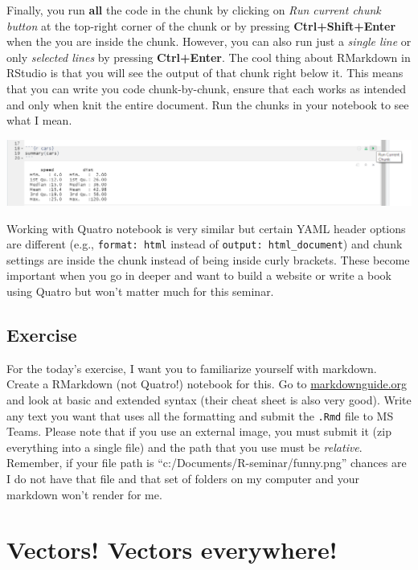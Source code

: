 \documentclass[
]{book}
\begin{document}
Finally, you run \textbf{all} the code in the chunk by clicking on \emph{Run current chunk button} at the top-right corner of the chunk or by pressing \textbf{Ctrl+Shift+Enter} when the you are inside the chunk. However, you can also run just a \emph{single line} or only \emph{selected lines} by pressing \textbf{Ctrl+Enter}. The cool thing about RMarkdown in RStudio is that you will see the output of that chunk right below it. This means that you can write you code chunk-by-chunk, ensure that each works as intended and only when knit the entire document. Run the chunks in your notebook to see what I mean.

\begin{center}\includegraphics[width=1\linewidth]{images/notebook-run-chunk} \end{center}

Working with Quatro notebook is very similar but certain YAML header options are different (e.g., \texttt{format:\ html} instead of \texttt{output:\ html\_document}) and chunk settings are inside the chunk instead of being inside curly brackets. These become important when you go in deeper and want to build a website or write a book using Quatro but won't matter much for this seminar.

\hypertarget{exercise}{%
\section{Exercise}\label{exercise}}

For the today's exercise, I want you to familiarize yourself with markdown. Create a RMarkdown (not Quatro!) notebook for this. Go to \href{https://www.markdownguide.org/}{markdownguide.org} and look at basic and extended syntax (their cheat sheet is also very good). Write any text you want that uses all the formatting and submit the \texttt{.Rmd} file to MS Teams. Please note that if you use an external image, you must submit it (zip everything into a single file) and the path that you use must be \emph{relative}. Remember, if your file path is ``c:/Documents/R-seminar/funny.png'' chances are I do not have that file and that set of folders on my computer and your markdown won't render for me.

\hypertarget{vectors}{%
\chapter{Vectors! Vectors everywhere!}\label{vectors}}
\end{document}
